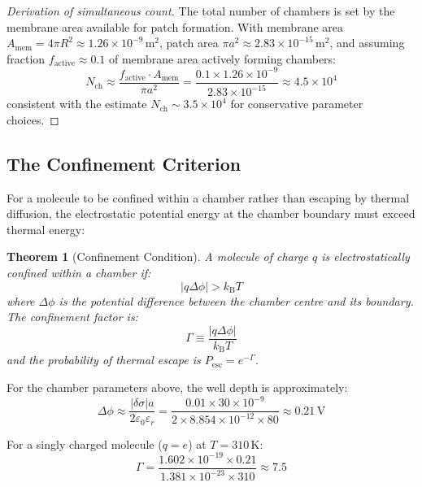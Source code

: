 \documentclass[12pt,a4paper]{article}
\newtheorem{theorem}{Theorem}[section]
\theoremstyle{definition}
\theoremstyle{remark}
\newcommand{\kB}{k_{\mathrm{B}}}
\newcommand{\eps}{\varepsilon}
\newcommand{\epsz}{\varepsilon_{0}}
\newcommand{\abs}[1]{\left|#1\right|}
\newcommand{\Ncham}{N_{\mathrm{ch}}}
\begin{document}
\begin{proof}[Derivation of simultaneous count]
The total number of chambers is set by the membrane area available for patch formation. With membrane area $A_{\mathrm{mem}} = 4\pi R^2 \approx 1.26 \times 10^{-9}$\,m$^2$, patch area $\pi a^2 \approx 2.83 \times 10^{-15}$\,m$^2$, and assuming fraction $f_{\mathrm{active}} \approx 0.1$ of membrane area actively forming chambers:
\begin{equation}
  \Ncham \approx \frac{f_{\mathrm{active}} \cdot A_{\mathrm{mem}}}{\pi a^2} = \frac{0.1 \times 1.26 \times 10^{-9}}{2.83 \times 10^{-15}} \approx 4.5 \times 10^4
\end{equation}
consistent with the estimate $\Ncham \sim 3.5 \times 10^4$ for conservative parameter choices.
\end{proof}

\subsection{The Confinement Criterion}

For a molecule to be confined within a chamber rather than escaping by thermal diffusion, the electrostatic potential energy at the chamber boundary must exceed thermal energy:

\begin{theorem}[Confinement Condition]
\label{thm:confinement}
A molecule of charge $q$ is electrostatically confined within a chamber if:
\begin{equation}
  \abs{q \Delta\phi} > \kB T
  \label{eq:confinement}
\end{equation}
where $\Delta\phi$ is the potential difference between the chamber centre and its boundary. The confinement factor is:
\begin{equation}
  \Gamma \equiv \frac{\abs{q \Delta\phi}}{\kB T}
\end{equation}
and the probability of thermal escape is $P_{\mathrm{esc}} = e^{-\Gamma}$.
\end{theorem}

For the chamber parameters above, the well depth is approximately:
\begin{equation}
  \Delta\phi \approx \frac{\abs{\delta\sigma} a}{2 \epsz \eps_r} = \frac{0.01 \times 30 \times 10^{-9}}{2 \times 8.854 \times 10^{-12} \times 80} \approx 0.21\,\mathrm{V}
\end{equation}

For a singly charged molecule ($q = e$) at $T = 310$\,K:
\begin{equation}
  \Gamma = \frac{1.602 \times 10^{-19} \times 0.21}{1.381 \times 10^{-23} \times 310} \approx 7.5
\end{equation}
\end{document}
